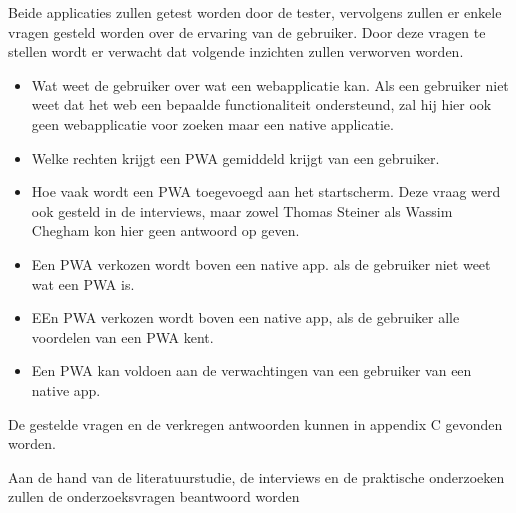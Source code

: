 Beide applicaties zullen getest worden door de tester, vervolgens zullen er enkele vragen gesteld worden over de ervaring van de gebruiker.
Door deze vragen te stellen wordt er verwacht dat volgende inzichten zullen verworven worden.
\begin{itemize}
	\item Wat weet de gebruiker over wat een webapplicatie kan. Als een gebruiker niet weet dat het web een bepaalde functionaliteit ondersteund, zal hij hier ook geen webapplicatie voor zoeken maar een native applicatie.
	\item Welke rechten krijgt een PWA gemiddeld krijgt van een gebruiker.
	\item Hoe vaak wordt een PWA toegevoegd aan het startscherm. Deze vraag werd ook gesteld in de interviews, maar zowel Thomas Steiner als Wassim Chegham kon hier geen antwoord op geven.
	\item Een PWA verkozen wordt boven een native app. als de gebruiker niet weet wat een PWA is.
	\item EEn PWA verkozen wordt boven een native app, als de gebruiker alle voordelen van een PWA kent.	
	\item Een PWA kan voldoen aan de verwachtingen van een gebruiker van een native app.
\end{itemize}

De gestelde vragen en de verkregen antwoorden kunnen in appendix C gevonden worden.


Aan de hand van de literatuurstudie, de interviews en de praktische onderzoeken zullen de onderzoeksvragen beantwoord worden

